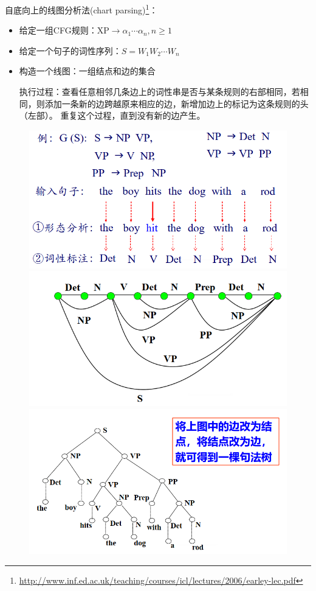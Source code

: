 自底向上的线图分析法(chart parsing)\footnote{\url{http://www.inf.ed.ac.uk/teaching/courses/icl/lectures/2006/earley-lec.pdf}}：
\begin{itemize}
	\item 给定一组CFG规则：XP$\to\alpha_1\cdots\alpha_n,n\geq 1$
	\item 给定一个句子的词性序列：$S=W_1W_2\cdots W_n$
	\item 构造一个线图：一组结点和边的集合
	\begin{center}
	\end{center}
	执行过程：查看任意相邻几条边上的词性串是否与某条规则的右部相同，若相同，则添加一条新的边跨越原来相应的边，新增加边上的标记为这条规则的头（左部）。
	重复这个过程，直到没有新的边产生。
\end{itemize}
\begin{figure}[H]
\centering
\includegraphics[width=0.6\linewidth]{fig/chart_parsing.png}
\includegraphics[width=0.6\linewidth]{fig/chart_parsing_2.png}
\includegraphics[width=0.6\linewidth]{fig/chart_parsing_3.png}
\end{figure}

